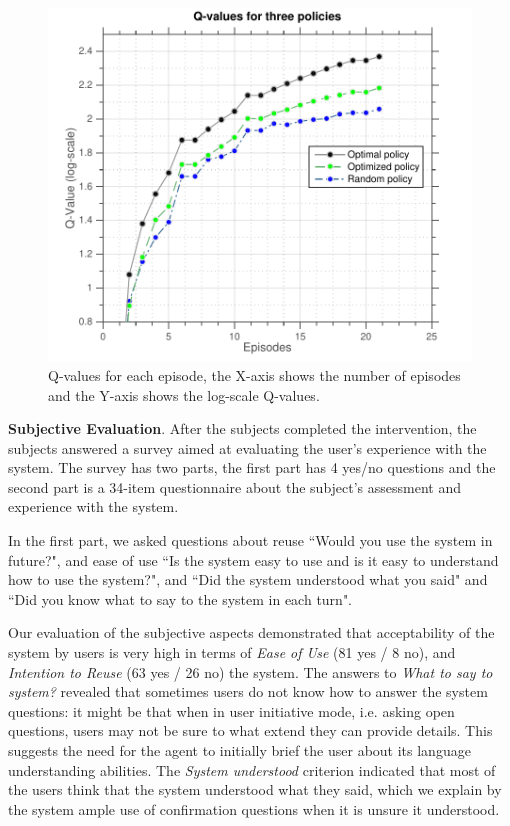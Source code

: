 \documentclass[letterpaper]{article}
\begin{document}
\begin{inparaenum}[1)]
 \begin{figure}
 \centering
 \includegraphics[width=\columnwidth]{figures/q-values.pdf}
 \caption{Q-values for each episode, the X-axis shows the number of episodes and the Y-axis shows the log-scale Q-values.}
 \label{q-values}
 \end{figure}


{\bf Subjective Evaluation}. After the subjects completed the intervention, the subjects answered a survey aimed at evaluating the user's experience with the system. The survey has two parts, the first part has 4 yes/no questions and the second part is a 34-item questionnaire about the subject's assessment and experience with the system. 

In the first part, we asked questions about reuse ``Would you use the system in future?", and ease of use ``Is the system easy to use and is it easy to understand how to use the system?", and ``Did the system understood what you said" and ``Did you know what to say to the system in each turn".

Our evaluation of the subjective aspects 
demonstrated that acceptability of the system by users is very high in terms of {\em Ease of Use} (81 yes / 8 no), and {\em Intention to Reuse} (63 yes / 26 no)
the system. The answers to {\em What to say to system?} revealed that sometimes users do not know how to answer the system questions: it might be that when in user initiative mode, i.e. asking open questions, users may not be sure to what extend they can provide details. This suggests the need for the agent to initially brief the user about its language understanding abilities.
The {\em System understood} criterion indicated that most of the users think that the system understood what they said, which we explain by the system ample use of confirmation questions when it is unsure it understood. 


\end{inparaenum}
\end{document}
